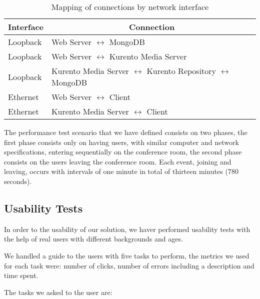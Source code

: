   \begin{table}[!htb]
\centering
\caption{Mapping of connections by network interface}
\label{table:interfacemap}
\begin{tabular}{|l|l|}
\hline
\multicolumn{1}{|c|}{\textbf{Interface}} & \multicolumn{1}{c|}{\textbf{Connection}}         \\ \hline
Loopback & Web Server $\leftrightarrow$ MongoDB  \\ \hline
Loopback & Web Server $\leftrightarrow$ Kurento Media Server  \\ \hline
Loopback & Kurento Media Server $\leftrightarrow$ Kurento Repository $\leftrightarrow$ MongoDB  \\ \hline
Ethernet & Web Server $\leftrightarrow$ Client\\ \hline
Ethernet & Kurento Media Server $\leftrightarrow$ Client\\ \hline
\end{tabular}
\end{table}


      The performance test scenario that we have defined consists on two phases, the first phase consists only on having users, with similar computer and network specifications, entering sequentially on the conference room, the second phase consists on the users leaving the conference room. Each event, joining and leaving, occurs with intervals of one minute in total of thirteen minutes (780 seconds).

  \subsection {Usability Tests}

      In order to the usability of our solution, we haver performed usability tests with the help of real users with different backgrounds and ages.

      We handled a guide to the users with five tasks to perform, the metrics we used for each task were: number of clicks, number of errors including a description and time spent. 

      The tasks we asked to the user are:

